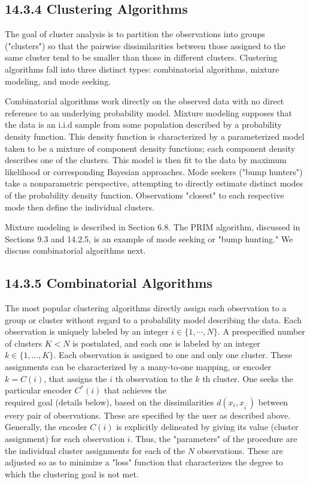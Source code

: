 \documentclass[10pt]{article}
\begin{document}
\subsection*{14.3.4 Clustering Algorithms}
The goal of cluster analysis is to partition the observations into groups ("clusters") so that the pairwise dissimilarities between those assigned to the same cluster tend to be smaller than those in different clusters. Clustering algorithms fall into three distinct types: combinatorial algorithms, mixture modeling, and mode seeking.

Combinatorial algorithms work directly on the observed data with no direct reference to an underlying probability model. Mixture modeling supposes that the data is an i.i.d sample from some population described by a probability density function. This density function is characterized by a parameterized model taken to be a mixture of component density functions; each component density describes one of the clusters. This model is then fit to the data by maximum likelihood or corresponding Bayesian approaches. Mode seekers ("bump hunters") take a nonparametric perspective, attempting to directly estimate distinct modes of the probability density function. Observations "closest" to each respective mode then define the individual clusters.

Mixture modeling is described in Section 6.8. The PRIM algorithm, discussed in Sections 9.3 and 14.2.5, is an example of mode seeking or "bump hunting." We discuss combinatorial algorithms next.

\subsection*{14.3.5 Combinatorial Algorithms}
The most popular clustering algorithms directly assign each observation to a group or cluster without regard to a probability model describing the data. Each observation is uniquely labeled by an integer $i \in\{1, \cdots, N\}$. A prespecified number of clusters $K<N$ is postulated, and each one is labeled by an integer $k \in\{1, \ldots, K\}$. Each observation is assigned to one and only one cluster. These assignments can be characterized by a many-to-one mapping, or encoder $k=C(i)$, that assigns the $i$ th observation to the $k$ th cluster. One seeks the particular encoder $C^{*}(i)$ that achieves the\\
required goal (details below), based on the dissimilarities $d\left(x_{i}, x_{i^{\prime}}\right)$ between every pair of observations. These are specified by the user as described above. Generally, the encoder $C(i)$ is explicitly delineated by giving its value (cluster assignment) for each observation $i$. Thus, the "parameters" of the procedure are the individual cluster assignments for each of the $N$ observations. These are adjusted so as to minimize a "loss" function that characterizes the degree to which the clustering goal is not met.
\end{document}
